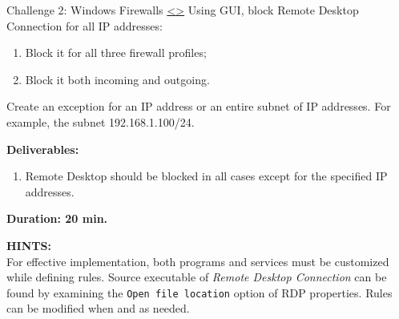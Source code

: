 \documentclass[12pt]{extarticle}
\newenvironment{instructionblock}{\Large\bgroup}{\egroup}
\newcommand{\ben}{\begin{enumerate}}
\newcommand{\een}{\end{enumerate}}
\begin{document}
\vspace{8mm}
\noindent







\pagebreak
\begin{slide}{ Challenge 2: Windows Firewalls }{ \hyperref[slide 15]{\textless}\hyperref[slide 17]{\textgreater} }
	\vskip 5pt
\begin{instructionblock}
	Using GUI, block Remote Desktop Connection for all IP addresses: 
	\begin{enumerate}
	\item Block it for all three firewall profiles;
	\item Block it both incoming and outgoing.
	\end{enumerate}
	
	Create an exception for an IP address or an entire subnet of IP addresses. For example, the subnet 192.168.1.100/24.
	
\end{instructionblock}
\textbf{\Large{Deliverables:}}
\ben
\item Remote Desktop should be blocked in all cases except for the specified IP addresses.
\een

\vspace{20mm}
\begin{center}
	\textbf{\Large{Duration: 20 min.} }
\end{center}

\end{slide}  


\vspace{8mm}
\noindent
\textbf{HINTS:}\\
For effective implementation, both programs and services must be customized while defining rules. Source executable of \textit{Remote Desktop Connection} can be found by examining the \texttt{Open file location} option of RDP properties. Rules can be modified when and as needed.


\end{document}
